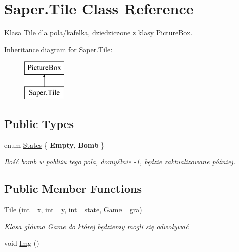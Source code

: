 \hypertarget{class_saper_1_1_tile}{}\section{Saper.\+Tile Class Reference}
\label{class_saper_1_1_tile}


Klasa \mbox{\hyperlink{class_saper_1_1_tile}{Tile}} dla pola/kafelka, dziedziczone z klasy Picture\+Box.  


Inheritance diagram for Saper.\+Tile\+:\begin{figure}[H]
\begin{center}
\leavevmode
\includegraphics[height=2.000000cm]{class_saper_1_1_tile}
\end{center}
\end{figure}
\subsection*{Public Types}
\begin{DoxyCompactItemize}
\item 
\mbox{\label{class_saper_1_1_tile_a4318bc08fbfd24d56ffa8ea1359d845c}} 
enum \mbox{\hyperlink{class_saper_1_1_tile_a4318bc08fbfd24d56ffa8ea1359d845c}{States}} \{ {\bfseries Empty}, 
{\bfseries Bomb}
 \}
\begin{DoxyCompactList}\small\item\em Ilość bomb w pobliżu tego pola, domyślnie -\/1, będzie zaktualizowane później. \end{DoxyCompactList}\end{DoxyCompactItemize}
\subsection*{Public Member Functions}
\begin{DoxyCompactItemize}
\item 
\mbox{\hyperlink{class_saper_1_1_tile_a5225a6086870b9c2c9cad42ae248be68}{Tile}} (int \+\_\+x, int \+\_\+y, int \+\_\+state, \mbox{\hyperlink{class_saper_1_1_game}{Game}} \+\_\+gra)
\begin{DoxyCompactList}\small\item\em Klasa główna \mbox{\hyperlink{class_saper_1_1_game}{Game}} do której będziemy mogli się odwoływać \end{DoxyCompactList}\item 
void \mbox{\hyperlink{class_saper_1_1_tile_a5d81eaa0b173ccb79598393706087e6d}{Img}} ()
\end{DoxyCompactItemize}
